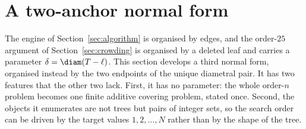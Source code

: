%
%
%
%

\section{A two-anchor normal form}\label{sec:doubleend}

The engine of Section~\ref{sec:algorithm} is organised by edges, and the
order-$25$ argument of Section~\ref{sec:crowding} is organised by a deleted
leaf and carries a parameter $\delta=\diam(T-\ell)$.  This section develops a
third normal form, organised instead by the two endpoints of the unique
diametral pair.  It has two features that the other two lack.  First, it has no
parameter: the whole order-$n$ problem becomes one finite additive covering
problem, stated once.  Second, the objects it enumerates are not trees but
pairs of integer sets, so the search order can be driven by the target values
$1,2,\dots,N$ rather than by the shape of the tree.

